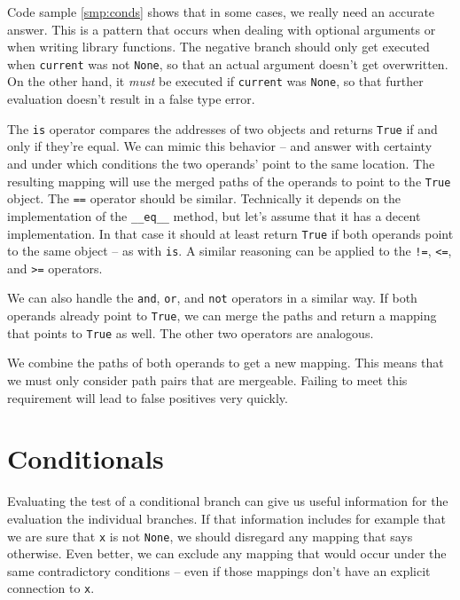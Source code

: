 \documentclass[a4paper, 16pt, oneside]{Thesis}
\begin{document}
Code sample \ref{smp:conds} shows that in some cases, we really need an
accurate answer. This is a pattern that occurs when dealing with
optional arguments or when writing library functions. The negative
branch should only get executed when \texttt{current} was not
\texttt{None}, so that an actual argument doesn't get overwritten. On
the other hand, it \emph{must} be executed if \texttt{current} was
\texttt{None}, so that further evaluation doesn't result in a false type
error.

The \texttt{is} operator compares the addresses of two objects and
returns \texttt{True} if and only if they're equal. We can mimic this
behavior -- and answer with certainty and under which conditions the two
operands' point to the same location. The resulting mapping will use the
merged paths of the operands to point to the \texttt{True} object. The
\texttt{==} operator should be similar. Technically it depends on the
implementation of the \texttt{\_\_eq\_\_} method, but let's assume that
it has a decent implementation. In that case it should at least return
\texttt{True} if both operands point to the same object -- as with
\texttt{is}. A similar reasoning can be applied to the \texttt{!=},
\texttt{\textless{}=}, and \texttt{\textgreater{}=} operators.

We can also handle the \texttt{and}, \texttt{or}, and \texttt{not}
operators in a similar way. If both operands already point to
\texttt{True}, we can merge the paths and return a mapping that points
to \texttt{True} as well. The other two operators are analogous.

We combine the paths of both operands to get a new mapping. This means
that we must only consider path pairs that are mergeable. Failing to
meet this requirement will lead to false positives very quickly.

\section{Conditionals}\label{conditionals}

Evaluating the test of a conditional branch can give us useful
information for the evaluation the individual branches. If that
information includes for example that we are sure that \texttt{x} is not
\texttt{None}, we should disregard any mapping that says otherwise. Even
better, we can exclude any mapping that would occur under the same
contradictory conditions -- even if those mappings don't have an
explicit connection to \texttt{x}.
\end{document}
